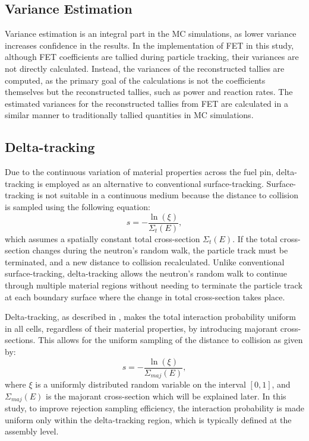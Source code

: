 \subsection{Variance Estimation}\label{sec22a}

Variance estimation is an integral part in the MC simulations, as lower variance increases confidence in the results. In the implementation of FET in this study, although FET coefficients are tallied during particle tracking, their variances are not directly calculated. Instead, the variances of the reconstructed tallies are computed, as the primary goal of the calculations is not the coefficients themselves but the reconstructed tallies, such as power and reaction rates. The estimated variances for the reconstructed tallies from FET are calculated in a similar manner to traditionally tallied quantities in MC simulations.

\subsection{Delta-tracking} \label{sec23}
Due to the continuous variation of material properties across the fuel pin, delta-tracking is employed as an alternative to conventional surface-tracking. Surface-tracking is not suitable in a continuous medium because the distance to collision is sampled using the following equation:
\begin{equation}
    s = -\frac{\ln(\xi)}{\Sigma_{t}(E)},
    \label{eq8}
\end{equation}
which assumes a spatially constant total cross-section $\Sigma_{t}(E)$. If the total cross-section changes during the neutron's random walk, the particle track must be terminated, and a new distance to collision recalculated. Unlike conventional surface-tracking, delta-tracking allows the neutron's random walk to continue through multiple material regions without needing to terminate the particle track at each boundary surface where the change in total cross-section takes place.

Delta-tracking, as described in \cite{leppanen_2017, woodcock}, makes the total interaction probability uniform in all cells, regardless of their material properties, by introducing majorant cross-sections. This allows for the uniform sampling of the distance to collision as given by:
\begin{equation}
    s = -\frac{\ln{\left(\xi\right)}}{\Sigma_{maj}(E)},
    \label{eq8}
\end{equation}
where \(\xi\) is a uniformly distributed random variable on the interval \([0,1]\), and \(\Sigma_{maj}(E)\) is the majorant cross-section which will be explained later. In this study, to improve rejection sampling efficiency, the interaction probability is made uniform only within the delta-tracking region, which is typically defined at the assembly level. 

